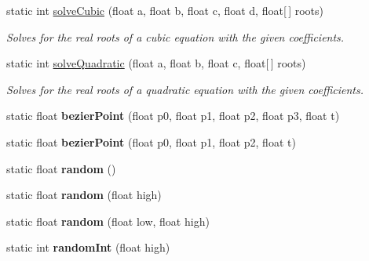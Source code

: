 \begin{DoxyCompactItemize}
\item 
static int \hyperlink{classhype_1_1core_1_1util_1_1_h_math_a67854709c53bde506d4b6b25e402dd51}{solve\-Cubic} (float a, float b, float c, float d, float\mbox{[}$\,$\mbox{]} roots)
\begin{DoxyCompactList}\small\item\em Solves for the real roots of a cubic equation with the given coefficients. \end{DoxyCompactList}\item 
static int \hyperlink{classhype_1_1core_1_1util_1_1_h_math_a609af488b52d1819028d7564c649dadd}{solve\-Quadratic} (float a, float b, float c, float\mbox{[}$\,$\mbox{]} roots)
\begin{DoxyCompactList}\small\item\em Solves for the real roots of a quadratic equation with the given coefficients. \end{DoxyCompactList}\item 
\hypertarget{classhype_1_1core_1_1util_1_1_h_math_ab27b411a8dfcaeaa05f93fb6c391896f}{static float {\bfseries bezier\-Point} (float p0, float p1, float p2, float p3, float t)}\label{classhype_1_1core_1_1util_1_1_h_math_ab27b411a8dfcaeaa05f93fb6c391896f}

\item 
\hypertarget{classhype_1_1core_1_1util_1_1_h_math_a082b688ed12d10c34197faea1e39fff8}{static float {\bfseries bezier\-Point} (float p0, float p1, float p2, float t)}\label{classhype_1_1core_1_1util_1_1_h_math_a082b688ed12d10c34197faea1e39fff8}

\item 
\hypertarget{classhype_1_1core_1_1util_1_1_h_math_a1883af69d44ef3f7eb5492210ad301de}{static float {\bfseries random} ()}\label{classhype_1_1core_1_1util_1_1_h_math_a1883af69d44ef3f7eb5492210ad301de}

\item 
\hypertarget{classhype_1_1core_1_1util_1_1_h_math_a6646c07d199e5343e53a8d3219404788}{static float {\bfseries random} (float high)}\label{classhype_1_1core_1_1util_1_1_h_math_a6646c07d199e5343e53a8d3219404788}

\item 
\hypertarget{classhype_1_1core_1_1util_1_1_h_math_affed1035cc3aeccd85cbf16a3d26c04e}{static float {\bfseries random} (float low, float high)}\label{classhype_1_1core_1_1util_1_1_h_math_affed1035cc3aeccd85cbf16a3d26c04e}

\item 
\hypertarget{classhype_1_1core_1_1util_1_1_h_math_aa4c047f2e6512d2d1f66c83afe316756}{static int {\bfseries random\-Int} (float high)}\label{classhype_1_1core_1_1util_1_1_h_math_aa4c047f2e6512d2d1f66c83afe316756}


\end{DoxyCompactItemize}
